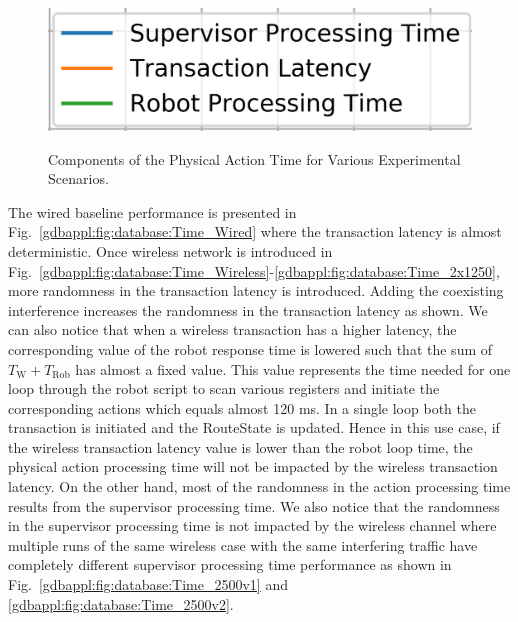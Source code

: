 \begin{figure}[!ht]
	\quad
	{\includegraphics[width=.32\columnwidth]{chapter-gdb-appl/figures/database/Legend.png}}
	\caption{Components of the Physical Action Time for Various Experimental Scenarios.\vspace{-0.2in}}
	\label{gdbappl:fig:database:Time}
\end{figure}

The wired baseline performance is presented in Fig.~\ref{gdbappl:fig:database:Time_Wired} where the transaction latency is almost deterministic. Once wireless network is introduced in Fig.~\ref{gdbappl:fig:database:Time_Wireless}-\ref{gdbappl:fig:database:Time_2x1250}, more randomness in the transaction latency is introduced. Adding the coexisting interference increases the randomness in the transaction latency as shown. We can also notice that when a wireless transaction has a higher latency, the corresponding value of the robot response time is lowered such that the sum of $T_\text{W}+T_\text{Rob}$ has almost a fixed value. This value represents the time needed for one loop through the robot script to scan various registers and initiate the corresponding actions which equals almost 120 ms. In a single loop both the transaction is initiated and the RouteState is updated. Hence in this use case, if the wireless transaction latency value is lower than the robot loop time, the physical action processing time will not be impacted by the wireless transaction latency. On the other hand, most of the randomness in the action processing time results from the supervisor processing time. We also notice that the randomness in the supervisor processing time is not impacted by the wireless channel where multiple runs of the same wireless case with the same interfering traffic have completely different supervisor processing time performance as shown in Fig.~\ref{gdbappl:fig:database:Time_2500v1} and \ref{gdbappl:fig:database:Time_2500v2}.   
     

